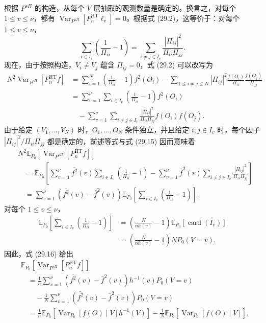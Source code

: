 根据 $P^{s\Pi}$ 的构造，从每个 $V$ 层抽取的观测数量是确定的。换言之，对每个 $1\le v\le\nu$，都有 $\operatorname{Var}_{P^{s\Pi}}[P_n^{\mathrm{HT}}\ell_v]=0$。根据式 (29.2)，这等价于：对每个 $1\le v\le\nu$，
\begin{equation}
\sum_{i\in I_v}\left(\frac1{\Pi_{ii}}-1\right)
=\sum_{i\ne j\in I_v}\frac{|\Pi_{ij}|^2}{\Pi_{ii}\Pi_{jj}}.
\tag{29.15}
\end{equation}
现在，由于按照构造，$V_i\ne V_j$ 蕴含 $\Pi_{ij}=0$，式 (29.2) 可以改写为
\[
\begin{aligned}
N^2\operatorname{Var}_{P^{s\Pi}}\!\left[P_n^{\mathrm{HT}}f\right]
&=\sum_{i=1}^N\left(\frac1{\Pi_{ii}}-1\right)f^2(O_i)
-\sum_{1\le i\ne j\le N}|\Pi_{ij}|^2\frac{f(O_i)}{\Pi_{ii}}\frac{f(O_j)}{\Pi_{jj}}\\
&=\sum_{v=1}^\nu\sum_{i\in I_v}\left(\frac1{\Pi_{ii}}-1\right)f^2(O_i)\\
&\quad-\sum_{v=1}^\nu\sum_{i\ne j\in I_v}
\frac{|\Pi_{ij}|^2}{\Pi_{ii}\Pi_{jj}}f(O_i)f(O_j).
\end{aligned}
\]
由于给定 $(V_1,\ldots,V_N)$ 时，$O_1,\ldots,O_N$ 条件独立，并且给定 $i,j\in I_v$ 时，每个因子 $|\Pi_{ij}|^2/\Pi_{ii}\Pi_{jj}$ 都是确定的，前述等式与式 (29.15) 因而意味着
\begin{equation}
\begin{aligned}
&N^2\mathbb E_{P_0}\!\left[\operatorname{Var}_{P^{s\Pi}}\!\left[P_n^{\mathrm{HT}}f\right]\right]\\
&\quad=\mathbb E_{P_0}\!\left[
\sum_{v=1}^\nu\overline{f^2}(v)\sum_{i\in I_v}\left(\frac1{\Pi_{ii}}-1\right)
-\sum_{v=1}^\nu\bar f^2(v)\sum_{i\ne j\in I_v}\frac{|\Pi_{ij}|^2}{\Pi_{ii}\Pi_{jj}}
\right]\\
&\quad=\sum_{v=1}^\nu\left(\overline{f^2}(v)-\bar f^2(v)\right)
\mathbb E_{P_0}\!\left[\sum_{i\in I_v}\left(\frac1{\Pi_{ii}}-1\right)\right].
\end{aligned}
\tag{29.16}
\end{equation}
对每个 $1\le v\le\nu$，
\[
\begin{aligned}
\mathbb E_{P_0}\!\left[\sum_{i\in I_v}\left(\frac1{\Pi_{ii}}-1\right)\right]
&=\left(\frac N{nh(v)}-1\right)\mathbb E_{P_0}[\operatorname{card}(I_v)]\\
&=\left(\frac N{nh(v)}-1\right)NP_0(V=v).
\end{aligned}
\]
因此，式 (29.16) 给出
\[
\begin{aligned}
&\mathbb E_{P_0}\!\left[\operatorname{Var}_{P^{s\Pi}}\!\left[P_n^{\mathrm{HT}}f\right]\right]\\
&\quad=\frac1n\sum_{v=1}^\nu
\left(\overline{f^2}(v)-\bar f^2(v)\right)h^{-1}(v)P_0(V=v)\\
&\qquad-\frac1N\sum_{v=1}^\nu
\left(\overline{f^2}(v)-\bar f^2(v)\right)P_0(V=v)\\
&\quad=\frac1n\mathbb E_{P_0}\!\left[\operatorname{Var}_{P_0}[f(O)\mid V]h^{-1}(V)\right]
-\frac1N\mathbb E_{P_0}\!\left[\operatorname{Var}_{P_0}[f(O)\mid V]\right],
\end{aligned}
\]
